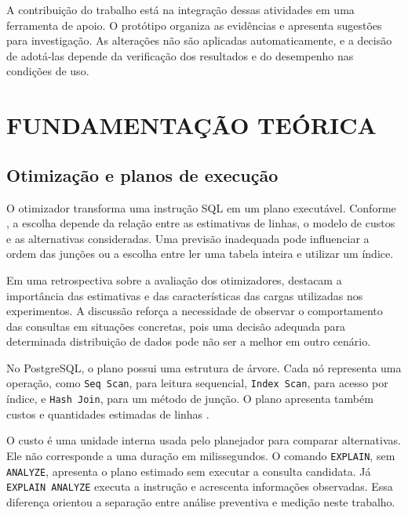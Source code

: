 \documentclass{UNESC}
\newcommand{\codigo}[1]{\texttt{#1}}
\begin{document}
A contribuição do trabalho está na integração dessas atividades em uma ferramenta de apoio. O protótipo organiza as evidências e apresenta sugestões para investigação. As alterações não são aplicadas automaticamente, e a decisão de adotá-las depende da verificação dos resultados e do desempenho nas condições de uso.


\section{FUNDAMENTAÇÃO TEÓRICA}

\subsection{Otimização e planos de execução}

O otimizador transforma uma instrução SQL em um plano executável. Conforme , a escolha depende da relação entre as estimativas de linhas, o modelo de custos e as alternativas consideradas. Uma previsão inadequada pode influenciar a ordem das junções ou a escolha entre ler uma tabela inteira e utilizar um índice.

Em uma retrospectiva sobre a avaliação dos otimizadores,  destacam a importância das estimativas e das características das cargas utilizadas nos experimentos. A discussão reforça a necessidade de observar o comportamento das consultas em situações concretas, pois uma decisão adequada para determinada distribuição de dados pode não ser a melhor em outro cenário.

No PostgreSQL, o plano possui uma estrutura de árvore. Cada nó representa uma operação, como \codigo{Seq Scan}, para leitura sequencial, \codigo{Index Scan}, para acesso por índice, e \codigo{Hash Join}, para um método de junção. O plano apresenta também custos e quantidades estimadas de linhas \cite{postgresql2026explain}.

O custo é uma unidade interna usada pelo planejador para comparar alternativas. Ele não corresponde a uma duração em milissegundos. O comando \codigo{EXPLAIN}, sem \codigo{ANALYZE}, apresenta o plano estimado sem executar a consulta candidata. Já \codigo{EXPLAIN ANALYZE} executa a instrução e acrescenta informações observadas. Essa diferença orientou a separação entre análise preventiva e medição neste trabalho.
\end{document}
